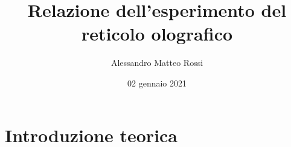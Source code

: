 \documentclass{article}
\title{Relazione dell'esperimento del reticolo olografico}
\author{Alessandro Matteo Rossi}
\date{02 gennaio 2021}
\begin{document}
\maketitle

\begingroup
{}
\begin{abstract}
    \centering
\end{abstract}
\endgroup



\tableofcontents
\newpage


\section{Introduzione teorica}
\end{document}
